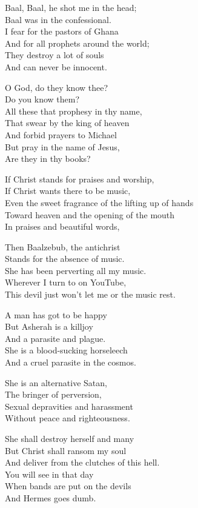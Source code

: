 \documentclass[
]{book}
\begin{document}
Baal, Baal, he shot me in the head;\\
Baal was in the confessional.\\
I fear for the pastors of Ghana\\
And for all prophets around the world;\\
They destroy a lot of souls\\
And can never be innocent.

O God, do they know thee?\\
Do you know them?\\
All these that prophesy in thy name,\\
That swear by the king of heaven\\
And forbid prayers to Michael\\
But pray in the name of Jesus,\\
Are they in thy books?

If Christ stands for praises and worship,\\
If Christ wants there to be music,\\
Even the sweet fragrance of the lifting up of hands\\
Toward heaven and the opening of the mouth\\
In praises and beautiful words,

Then Baalzebub, the antichrist\\
Stands for the absence of music.\\
She has been perverting all my music.\\
Wherever I turn to on YouTube,\\
This devil just won't let me or the music rest.

A man has got to be happy\\
But Asherah is a killjoy\\
And a parasite and plague.\\
She is a blood-sucking horseleech\\
And a cruel parasite in the cosmos.

She is an alternative Satan,\\
The bringer of perversion,\\
Sexual depravities and harassment\\
Without peace and righteousness.

She shall destroy herself and many\\
But Christ shall ransom my soul\\
And deliver from the clutches of this hell.\\
You will see in that day\\
When bands are put on the devils\\
And Hermes goes dumb.
\end{document}
